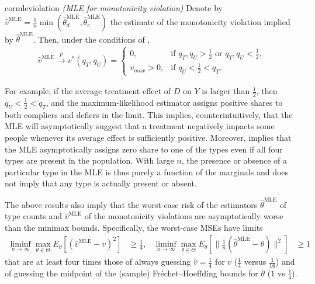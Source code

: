 \documentclass[12pt,reqno]{amsart}
\theoremstyle{theorem}
\theoremstyle{definition}
\newcommand{\0}{\mathbf{0}}
\newcommand{\1}{\mathbf{1}}
\begin{document}
\begin{restatable}{cor}{mleviolation}
\label{cor:mleviolation}
\emph{(MLE for monotonicity violation)}
Denote by $\hat{v}^{\text{MLE}} = \tfrac{1}{n}\min(\hat{\theta}^{\text{MLE}}_d, \hat{\theta}^{\text{MLE}}_c)$ the estimate of the monotonicity violation implied by $\hat{\theta}^{\text{MLE}}$.
Then, under the conditions of ,
\begin{align*}
    \hat{v}^{\text{MLE}} \xrightarrow{p} v^*(q_T,q_U)
    =
    \begin{cases}
        0, & \text{if } q_T, q_U > \tfrac{1}{2} \text{ or } q_T, q_U < \tfrac{1}{2}, \\
        v_{max} > 0, & \text{if } q_U < \tfrac{1}{2} < q_T.
    \end{cases}
\end{align*}

\end{restatable}

For example, 
if the average treatment effect of $D$ on $Y$ is larger than $\tfrac{1}{2}$, then $q_U < \tfrac{1}{2} < q_T$, and the maximum-likelihood estimator assigns positive shares to both compliers and defiers in the limit.
This implies, counterintuitively, that the MLE will asymptotically suggest that a treatment negatively impacts some people whenever its average effect is sufficiently positive.
Moreover,  implies that the MLE asymptotically assigns zero share to one of the types even if all four types are present in the population. With large $n$, the presence or absence of a particular type in the MLE is thus purely a function of the marginals and does not imply that any type is actually present or absent. 


The above results also imply that the worst-case risk of the estimators $\hat{\theta}^{\text{MLE}}$ of type counts and $\hat{v}^{\text{MLE}}$ of the monotonicity violations are asymptotically worse than the minimax bounds.
Specifically, the worst-case MSEs have limits
\begin{align*}
    \liminf_{n\to\infty}\max_{\theta \in \Theta} E_\theta\left[(\hat{v}^{\text{MLE}} -
    v)^2\right] &\ge \tfrac{1}{4},
    &
    \liminf_{n\to\infty}\max_{\theta \in \Theta} E_\theta\left[\big\|\tfrac{1}{n}(\hat{\theta}^{\text{MLE}} -
    \theta)\big\|^2\right] &\ge 1
\end{align*}
that are at least four times those of
always guessing $\hat{v} = \tfrac{1}{4}$ for $v$ ($\tfrac{1}{4}$ versus $\tfrac{1}{16}$)
and of
guessing the midpoint of the (sample) Fr\'echet--Hoeffding bounds for $\theta$ ($1$ vs $\tfrac{1}{4}$).
\end{document}

